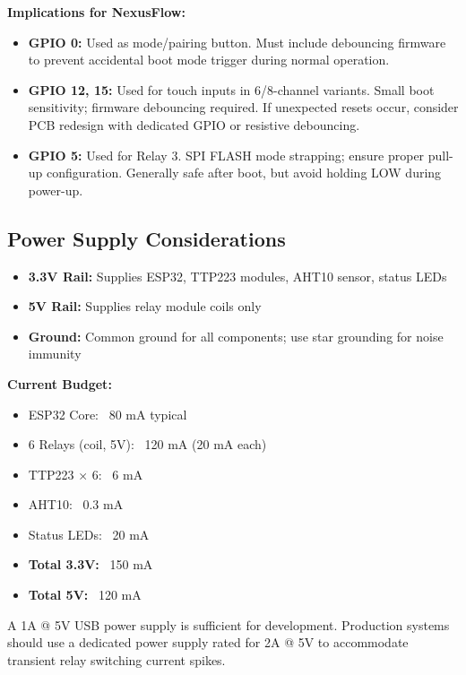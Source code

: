 \textbf{Implications for NexusFlow:}

\begin{itemize}
    \item \textbf{GPIO 0:} Used as mode/pairing button. Must include debouncing firmware to prevent accidental boot mode trigger during normal operation.
    
    \item \textbf{GPIO 12, 15:} Used for touch inputs in 6/8-channel variants. Small boot sensitivity; firmware debouncing required. If unexpected resets occur, consider PCB redesign with dedicated GPIO or resistive debouncing.
    
    \item \textbf{GPIO 5:} Used for Relay 3. SPI FLASH mode strapping; ensure proper pull-up configuration. Generally safe after boot, but avoid holding LOW during power-up.
\end{itemize}

\subsection{Power Supply Considerations}

\begin{itemize}
    \item \textbf{3.3V Rail:} Supplies ESP32, TTP223 modules, AHT10 sensor, status LEDs
    \item \textbf{5V Rail:} Supplies relay module coils only
    \item \textbf{Ground:} Common ground for all components; use star grounding for noise immunity
\end{itemize}

\textbf{Current Budget:}
\begin{itemize}
    \item ESP32 Core: ~80 mA typical
    \item 6 Relays (coil, 5V): ~120 mA (20 mA each)
    \item TTP223 × 6: ~6 mA
    \item AHT10: ~0.3 mA
    \item Status LEDs: ~20 mA
    \item \textbf{Total 3.3V:} ~150 mA
    \item \textbf{Total 5V:} ~120 mA
\end{itemize}

A 1A @ 5V USB power supply is sufficient for development. Production systems should use a dedicated power supply rated for 2A @ 5V to accommodate transient relay switching current spikes.


